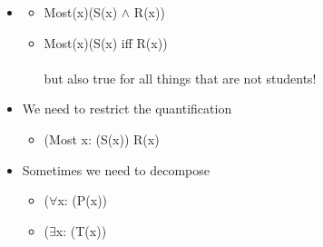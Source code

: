 \documentclass[headrule,footrule]{foils}
\begin{document}

\begin{itemize}
\item {}
  \begin{itemize}
  \item Most(x)(S(x) $\wedge$ R(x))
    \\ 
  \item Most(x)(S(x) iff R(x))
    \\ 
    \\ but also true for all things that are not students!
  \end{itemize}
\item We need to restrict the quantification
  \begin{itemize}
  \item (Most x: (S(x)) R(x)
  \end{itemize}
\item Sometimes we need to decompose
  \begin{itemize}
  \item {} ($\forall$x: (P(x))
  \item {} ($\exists$x: (T(x))
  \end{itemize}
\end{itemize}

\end{document}
